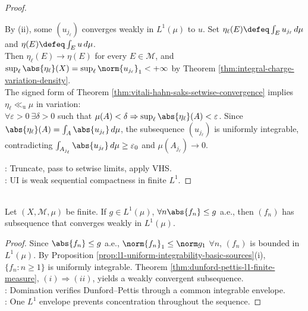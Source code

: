 \begin{theorem}
\begin{proof}
\begin{enumerate}[label=\roman*.]
By (ii), some $(u_{j_\ell})$ converges weakly in $L^1(\mu)$ to $u$. Set $\eta_\ell(E)\defeq\int_Eu_{j_\ell}\,d\mu$ and $\eta(E)\defeq\int_Eu\,d\mu$.\\
Then $\eta_\ell(E)\to\eta(E)$ for every $E\in\mathcal M$, and $\sup_\ell\abs{\eta_\ell}(X)=\sup_\ell\norm{u_{j_\ell}}_1<+\infty$ by Theorem \ref{thm:integral-charge-variation-density}.\\
The signed form of Theorem \ref{thm:vitali-hahn-saks-setwise-convergence} implies $\eta_\ell\ll_{\mathrm u}\mu$ in variation:\\
$\forall\varepsilon>0\ \exists\delta>0$ such that $\mu(A)<\delta\Rightarrow\sup_\ell\abs{\eta_\ell}(A)<\varepsilon$. Since $\abs{\eta_\ell}(A)=\int_A\abs{u_{j_\ell}}\,d\mu$, the subsequence $(u_{j_\ell})$ is uniformly integrable, contradicting $\int_{A_{j_\ell}}\abs{u_{j_\ell}}\,d\mu\geq\varepsilon_0$ and $\mu(A_{j_\ell})\to0$.
\end{enumerate}
: Truncate, pass to setwise limits, apply VHS.\\
: UI is weak sequential compactness in finite $L^1$.
\end{proof}
\end{theorem}

\begin{corollary} \label{cor:dominated-l1-weak-subsequence} \\
Let $(X,\mathcal M,\mu)$ be finite. If $g\in L^1(\mu)$, $\forall n \abs{f_n}\leq g$ a.e., then $(f_n)$ has subsequence that converges weakly in $L^1(\mu)$.
\begin{proof}
Since $\abs{f_n}\leq g$ a.e., $\norm{f_n}_1\leq\norm g_1$ $\forall n$, $(f_n)$ is bounded in $L^1(\mu)$. By Proposition \ref{prop:l1-uniform-integrability-basic-sources}(i), $\{f_n:n\geq1\}$ is uniformly integrable. Theorem \ref{thm:dunford-pettis-l1-finite-measure}, $(i)\Rightarrow(ii)$, yields a weakly convergent subsequence.\\
: Domination verifies Dunford--Pettis through a common integrable envelope.\\
: One $L^1$ envelope prevents concentration throughout the sequence.
\end{proof}
\end{corollary}

